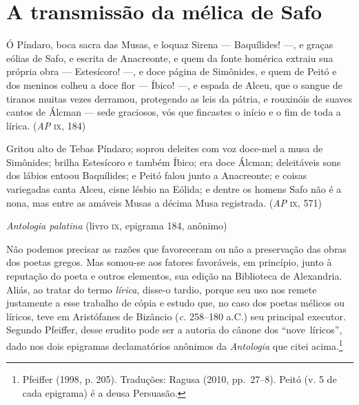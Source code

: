 \section{A transmissão da mélica de Safo}

\epigraph{Ó Píndaro, boca sacra das Musas, e loquaz Sirena --- %
Baquílides! ---, e graças eólias de Safo, %
e escrita de Anacreonte, e quem da fonte homérica %
extraiu sua própria obra --- Estesícoro! ---, %
e doce página de Simônides, e quem de Peitó e dos %
meninos colheu a doce flor --- Íbico! ---, %
e espada de Alceu, que o sangue de tiranos muitas vezes %
derramou, protegendo as leis da pátria, %
e rouxinóis de suaves cantos de Álcman --- sede graciosos, vós %
que fincastes o início e o fim de toda a lírica. %
\mbox{}\hfill (\textit{AP} \textsc{ix}, 184)

\smallskip

Gritou alto de Tebas Píndaro; soprou deleites %
com voz doce-mel a musa de Simônides; %
brilha Estesícoro e também Íbico; era doce Álcman; %
deleitáveis sons dos lábios entoou Baquílides; %
e Peitó falou junto a Anacreonte; e coisas variegadas canta %
Alceu, cisne lésbio na Eólida; %
e dentre os homens Safo não é a nona, mas entre as amáveis %
Musas a décima Musa registrada. %
\mbox{}\hfill (\textit{AP} \textsc{ix}, 571)}%
{\textit{Antologia palatina} (livro \textsc{ix}, epigrama 184, anônimo)}

Não podemos precisar as razões que favoreceram ou não a
preservação das obras dos poetas gregos. Mas somou-se aos fatores favoráveis,
em princípio, junto à reputação do poeta e outros elementos, sua edição na
Biblioteca de Alexandria. Aliás, ao tratar do termo \textit{lírica}, disse-o
tardio, porque seu uso nos remete justamente a esse trabalho de cópia e estudo
que, no caso dos poetas mélicos ou líricos, teve em Aristófanes de Bizâncio
(\textit{c.} 258--180 a.C.) seu principal executor. Segundo Pfeiffer, desse
erudito pode ser a autoria do cânone dos \mbox{“nove líricos”,}
dado nos dois epigramas declamatórios anônimos da \textit{Antologia} que citei
acima.\footnote{ Pfeiffer (1998, p. 205). Traduções: Ragusa (2010, pp.~27--8). Peitó (v. 5 de cada
epigrama) é a deusa Persuasão.}

